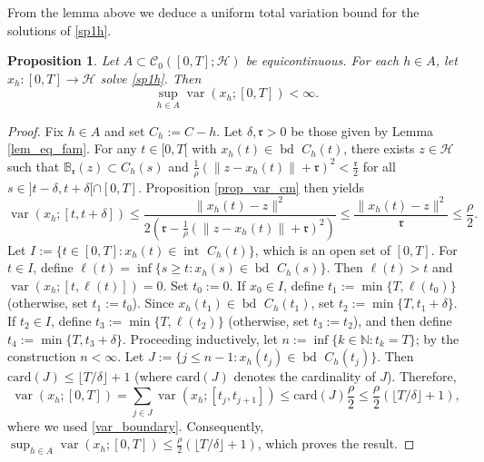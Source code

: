 \documentclass[preprint,12pt]{elsarticle}
\renewcommand{\H}{\mathcal{H}}
\newcommand{\N}{\mathbb{N}}
\newcommand{\inte}{{\operatorname{int \  }}}
\newcommand{\bd}{{\operatorname{bd \ }}}
\theoremstyle{plain}
\newtheorem{proposition}[theorem]{Proposition}
\theoremstyle{definition}
\theoremstyle{remark}
\begin{document}
	From the lemma above we deduce a uniform total variation bound for the solutions of \eqref{sp1h}.
	\begin{proposition}\label{prop-bv-mc}
		Let $A\subset \mathcal{C}_0([0,T];\H)$ be equicontinuous. For each $h\in A$, let $x_h\colon [0,T]\to \H$ solve \eqref{sp1h}. Then $$\sup_{h\in A}\operatorname{var}(x_h;[0,T])<\infty.$$
	\end{proposition}
\begin{proof}
Fix $h\in A$ and set $C_h := C-h$. Let $\delta,\mathfrak{r}>0$ be those given by Lemma \ref{lem_eq_fam}. For any $t\in [0,T[$ with $x_h(t)\in\bd C_h(t)$, there exists $z\in \H$ such that $\mathbb{B}_{\mathfrak{r}}(z)\subset C_h(s)$ and $\frac{1}{\rho}(\|z-x_h(t)\| + \mathfrak{r})^2<\frac{\mathfrak{r}}{2}$ for all $s\in ]t-\delta,t+\delta[\cap [0,T]$.  Proposition \ref{prop_var_cm} then yields 
\begin{equation}\label{var_boundary}
\operatorname{var}(x_h;[t,t+\delta])\leq \frac{\|x_h(t)-z\|^2}{2(\mathfrak{r}-\frac{1}{\rho} (\|z-x_h(t)\|+\mathfrak{r})^2)}\leq \frac{\|x_h(t)-z\|^2}{\mathfrak{r}}\leq \frac{\rho}{2}.
	\end{equation}
Let $I := \{t\in [0,T]: x_h(t)\in \inte C_h(t)\}$, which is an open set of $[0,T]$. For $t\in I$, define $\ell(t) = \inf\{s\geq t : x_h(s)\in \bd C_h(s)\}$. Then $\ell(t)>t$ and $\operatorname{var}(x_h;[t,\ell(t)]) = 0$. Set $t_0 := 0$. If $x_0\in I$, define  $t_1:= \min\{T,\ell(t_0)\}$ (otherwise, set $t_1 := t_0$). Since $x_h(t_1)\in\bd C_h(t_1)$,  set $t_2 := \min\{T,t_1 + \delta\}$. If $t_2\in I$, define $t_3 := \min\{T,\ell(t_2)\}$ (otherwise, set $t_3 := t_2$), and then define $t_4 := \min\{T,t_3 + \delta\}$. Proceeding inductively, let $n := \inf\{k\in\N : t_k = T\}$; by the construction $n<\infty$. Let $J:= \{j\leq n-1: x_h(t_j)\in \bd C_h(t_j)\}$. Then $\text{card}(J)\leq \lfloor T/\delta\rfloor + 1$ (where $\text{card}(J)$ denotes the cardinality of $J$). Therefore,
		\begin{equation*}
\operatorname{var}(x_h;[0,T])= \sum_{j\in J} \operatorname{var}(x_h;[t_j,t_{j+1}])\leq \text{card}(J)\frac{\rho}{2}\leq \frac{\rho}{2}(\lfloor T/\delta \rfloor + 1),
		\end{equation*}
where we used \eqref{var_boundary}. Consequently,  $\sup_{h\in A} \operatorname{var}(x_h;[0,T])\leq \frac{\rho}{2}(\lfloor T/\delta \rfloor + 1)$, which proves the result.
	\end{proof}
	

	
\end{document}
